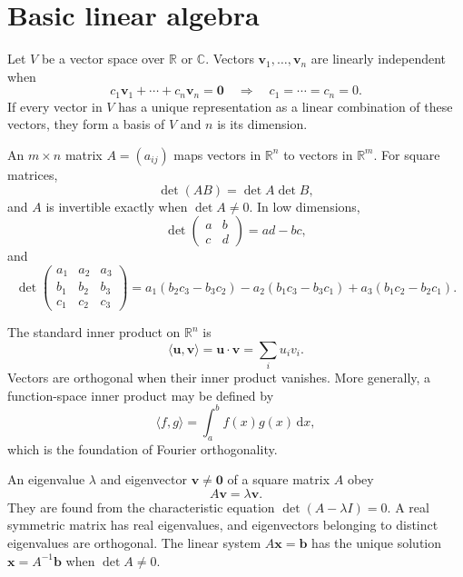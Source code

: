 \section{Basic linear algebra}

Let $V$ be a vector space over $\mathbb{R}$ or $\mathbb{C}$. Vectors $\mathbf{v}_1,\ldots,\mathbf{v}_n$ are linearly independent when
\begin{equation}
c_1\mathbf{v}_1+\cdots+c_n\mathbf{v}_n=\mathbf{0}
\quad\Rightarrow\quad c_1=\cdots=c_n=0.
\end{equation}
If every vector in $V$ has a unique representation as a linear combination of these vectors, they form a basis of $V$ and $n$ is its dimension.

An $m\times n$ matrix $A=(a_{ij})$ maps vectors in $\mathbb{R}^n$ to vectors in $\mathbb{R}^m$. For square matrices,
\begin{equation}
\det(AB)=\det A\det B,
\end{equation}
and $A$ is invertible exactly when $\det A\ne0$. In low dimensions,
\begin{equation}
\det\begin{pmatrix}a&b\\c&d\end{pmatrix}=ad-bc,
\end{equation}
and
\begin{equation}
\det\begin{pmatrix}a_1&a_2&a_3\\b_1&b_2&b_3\\c_1&c_2&c_3\end{pmatrix}
=a_1(b_2c_3-b_3c_2)-a_2(b_1c_3-b_3c_1)+a_3(b_1c_2-b_2c_1).
\end{equation}

The standard inner product on $\mathbb{R}^n$ is
\begin{equation}
\langle\mathbf{u},\mathbf{v}\rangle=\mathbf{u}\cdot\mathbf{v}=\sum_i u_iv_i.
\end{equation}
Vectors are orthogonal when their inner product vanishes. More generally, a function-space inner product may be defined by
\begin{equation}
\langle f,g\rangle=\int_a^b f(x)g(x)\,\mathrm{d}x,
\end{equation}
which is the foundation of Fourier orthogonality.

An eigenvalue $\lambda$ and eigenvector $\mathbf{v}\ne\mathbf{0}$ of a square matrix $A$ obey
\begin{equation}
A\mathbf{v}=\lambda\mathbf{v}.
\end{equation}
They are found from the characteristic equation $\det(A-\lambda I)=0$. A real symmetric matrix has real eigenvalues, and eigenvectors belonging to distinct eigenvalues are orthogonal. The linear system $A\mathbf{x}=\mathbf{b}$ has the unique solution $\mathbf{x}=A^{-1}\mathbf{b}$ when $\det A\ne0$.

